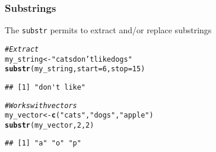 \documentclass[paper=screen,mathserif]{beamer}\usepackage[]{graphicx}\usepackage[]{color}
\makeatletter
\newcommand{\hlnum}[1]{\textcolor[rgb]{0.686,0.059,0.569}{#1}}%
\newcommand{\hlstr}[1]{\textcolor[rgb]{0.192,0.494,0.8}{#1}}%
\newcommand{\hlcom}[1]{\textcolor[rgb]{0.678,0.584,0.686}{\textit{#1}}}%
\newcommand{\hlstd}[1]{\textcolor[rgb]{0.345,0.345,0.345}{#1}}%
\newcommand{\hlkwb}[1]{\textcolor[rgb]{0.69,0.353,0.396}{#1}}%
\newcommand{\hlkwc}[1]{\textcolor[rgb]{0.333,0.667,0.333}{#1}}%
\newcommand{\hlkwd}[1]{\textcolor[rgb]{0.737,0.353,0.396}{\textbf{#1}}}%
\newenvironment{kframe}{%
 \def\at@end@of@kframe{}%
 \ifinner\ifhmode%
  \def\at@end@of@kframe{\end{minipage}}%
  \begin{minipage}{\columnwidth}%
 \fi\fi%
 \def\FrameCommand##1{\hskip\@totalleftmargin \hskip-\fboxsep
 \colorbox{shadecolor}{##1}\hskip-\fboxsep
     \hskip-\linewidth \hskip-\@totalleftmargin \hskip\columnwidth}%
 \MakeFramed {\advance\hsize-\width
   \@totalleftmargin\z@ \linewidth\hsize
   \@setminipage}}%
 {\par\unskip\endMakeFramed%
 \at@end@of@kframe}
\newenvironment{knitrout}{}{} %
\newcommand{\ft}[1]{\frametitle{#1}}
\newenvironment{xframe}[1][]
{\begin{frame}[fragile,environment=xframe]
    \frametitle{#1}}
  {\end{frame}}
\makeatother
\begin{document}
\begin{xframe}
  \ft{Substrings}
  
  The {\tt substr} permits to extract and/or replace substrings
\begin{knitrout}\scriptsize
{}\color{fgcolor}\begin{kframe}
\begin{alltt}
\hlcom{# Extract}
\hlstd{my_string} \hlkwb{<-} \hlstr{"cats don't like dogs"}
\hlkwd{substr}\hlstd{(my_string,} \hlkwc{start} \hlstd{=} \hlnum{6}\hlstd{,} \hlkwc{stop} \hlstd{=} \hlnum{15}\hlstd{)}
\end{alltt}
\begin{verbatim}
## [1] "don't like"
\end{verbatim}
\end{kframe}
\end{knitrout}
\begin{knitrout}\scriptsize
{}\color{fgcolor}\begin{kframe}
\begin{alltt}
\hlcom{# Works with vectors}
\hlstd{my_vector} \hlkwb{<-} \hlkwd{c}\hlstd{(}\hlstr{"cats"}\hlstd{,} \hlstr{"dogs"}\hlstd{,} \hlstr{"apple"}\hlstd{)}
\hlkwd{substr}\hlstd{(my_vector,} \hlnum{2}\hlstd{,} \hlnum{2}\hlstd{)}
\end{alltt}
\begin{verbatim}
## [1] "a" "o" "p"
\end{verbatim}
\end{kframe}
\end{knitrout}
\end{xframe}
\end{document}
